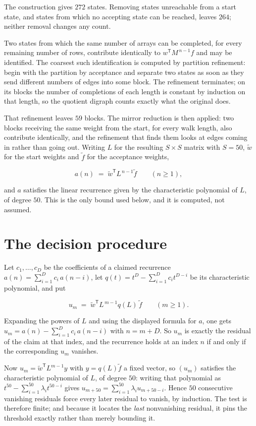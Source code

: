 \documentclass[11pt]{article}
\theoremstyle{definition}
\begin{document}
The construction gives $272$ states. Removing states unreachable from a start state, and states from which no accepting state can be reached, leaves $264$; neither removal changes any count.

Two states from which the same number of arrays can be completed, for every remaining number of rows, contribute identically to $w^{\mathsf T}M^{\,n-1}f$ and may be identified. The coarsest such identification is computed by partition refinement: begin with the partition by acceptance and separate two states as soon as they send different numbers of edges into some block. The refinement terminates; on its blocks the number of completions of each length is constant by induction on that length, so the quotient digraph counts exactly what the original does.

That refinement leaves $59$ blocks. The mirror reduction is then applied: two blocks receiving the same weight from the start, for every walk length, also contribute identically, and the refinement that finds them looks at edges coming in rather than going out. Writing $L$ for the resulting $S \times S$ matrix with $S = 50$, $\tilde w$ for the start weights and $\tilde f$ for the acceptance weights,

\[a(n) \;=\; \tilde w^{\mathsf T} L^{\,n-1} \tilde f \qquad (n \ge 1),\]

and $a$ satisfies the linear recurrence given by the characteristic polynomial of $L$, of degree $50$. This is the only bound used below, and it is computed, not assumed.

\section{The decision procedure}

Let $c_1,\dots,c_D$ be the coefficients of a claimed recurrence $a(n) = \sum_{i=1}^{D} c_i\,a(n-i)$, let $q(t) = t^{D} - \sum_{i=1}^{D} c_i t^{D-i}$ be its characteristic polynomial, and put

\[u_m \;=\; \tilde w^{\mathsf T} L^{\,m-1} q(L)\,\tilde f \qquad (m \ge 1).\]

Expanding the powers of $L$ and using the displayed formula for $a$, one gets $u_m = a(n) - \sum_{i=1}^{D} c_i\,a(n-i)$ with $n = m + D$. So $u_m$ is exactly the residual of the claim at that index, and the recurrence holds at an index $n$ if and only if the corresponding $u_m$ vanishes.

Now $u_m = \tilde w^{\mathsf T} L^{m-1} y$ with $y = q(L)\tilde f$ a fixed vector, so $(u_m)$ satisfies the characteristic polynomial of $L$, of degree $50$: writing that polynomial as $t^{50} - \sum_{i=1}^{50} \lambda_i t^{50-i}$ gives $u_{m+50} = \sum_{i=1}^{50} \lambda_i u_{m+50-i}$. Hence $50$ consecutive vanishing residuals force every later residual to vanish, by induction. The test is therefore finite; and because it locates the {\itshape last} nonvanishing residual, it pins the threshold exactly rather than merely bounding it.
\end{document}
